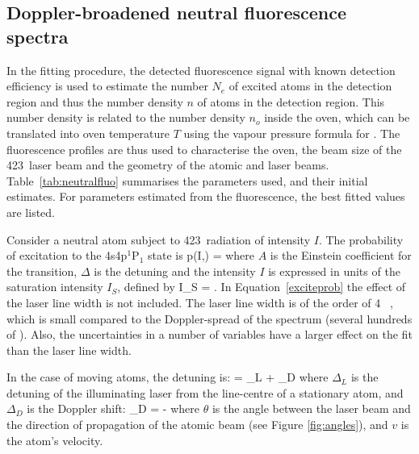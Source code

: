 \subsection{Doppler-broadened neutral fluorescence spectra}


In the fitting procedure, the detected fluorescence signal with known detection efficiency is used to estimate the number $N_e$ of excited atoms in the detection region and thus the number density $n$ of atoms in the detection region. This number density is related to the number density $n_o$ inside the \CaI{} oven, which can be translated into oven temperature $T$ using the vapour pressure formula for \CaI{}. The fluorescence profiles are thus used to characterise the \CaI{} oven, the beam size of the 423\nm\, laser beam and the geometry of the atomic and laser beams. Table~\ref{tab:neutralfluo} summarises the parameters used, and their initial estimates. For parameters estimated from the fluorescence, the best fitted values are listed. 

Consider a neutral  atom subject to 423\nm\, radiation of intensity $I$. The probability of excitation to the 4s4p$^1$P$_1$ state is
\be
p(I,\Delta) = 
\label{exciteprob}
\ee
where $A$ is the Einstein coefficient for the transition, $\Delta$ is the detuning and the intensity $I$ is expressed in units of the saturation intensity $I_S$, defined by
\be
I_S = .
\label{eq:satintdef}
\ee
In Equation~\ref{exciteprob} the effect of the laser line width is not included. The laser line width is of the order of 4 \MHz\, \cite{Lucas2004}, which is small compared to the Doppler-spread of the spectrum (several hundreds of \MHz). Also, the uncertainties in a number of variables have a larger effect on the fit than the laser line width.


In the case of moving atoms, the detuning is:
\be
\Delta = \Delta_L + \Delta_D
\ee
where $\Delta_L$ is the detuning of the illuminating laser from the line-centre of a stationary atom, and $\Delta_D$ is the Doppler shift:
\be
\Delta_D = -  \cos \theta 
\ee
where $\theta$ is the angle between the laser beam and the direction of propagation of the atomic beam (see Figure \ref{fig:angles}), and $v$ is the atom's velocity. 

